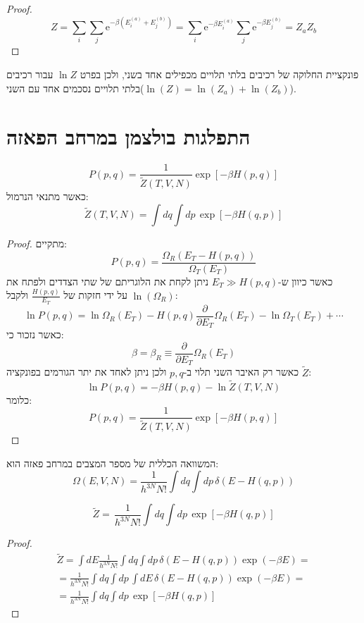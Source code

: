 \documentclass{tstextbook}
\begin{document}
\begin{proof}
$$Z=\sum_{i}\sum_{j}\mathrm{e}^{-\beta(E_{i}^{(a)}+E_{j}^{(b)})}=\sum_{i}\mathrm{e}^{-\beta E_{i}^{(a)}}\sum_{j}\mathrm{e}^{-\beta E_{j}^{(b)}}=Z_{a}Z_{b}$$

\end{proof}
\begin{corollary}
פונקציית החלוקה של רכיבים בלתי תלויים מכפילים אחד בשני, ולכן בפרט \(\ln Z\) עבור רכיבים בלתי תלויים נסכמים אחד עם השני(\(\ln(Z)=\ln(Z_{a})+\ln(Z_{b})\)).

\end{corollary}
\section{התפלגות בולצמן במרחב הפאזה}

\begin{proposition}
$$P(p,q)=\frac{1}{\tilde{Z}(T,V,N)}\exp[-\beta H(p,q)]$$
כאשר מתנאי הנרמול:
$$\tilde{Z}(T,V,N)=\int\!\!d q\int\!\!d p\,\exp[-\beta H(q,p)]$$

\end{proposition}
\begin{proof}
מתקיים:
$$P(p,q)=\frac{\Omega_{R}(E_{T}-H(p,q))}{\Omega_{T}(E_{T})}$$
כאשר כיוון ש-\(E_{T}\gg H(p,q)\) ניתן לקחת את הלוגריתם של שתי הצדדים ולפתח את \(\ln\left( \Omega_{R} \right)\) על ידי חזקות של \(\frac{H(p,q)}{E_{T}}\) ולקבל:
$$\ln P(p,q)=\ln\Omega_{R}(E_{T})-H(p,q)\frac{\partial}{\partial E_{T}}\Omega_{R}(E_{T})-\ln\Omega_{T}(E_{T})+\cdots$$
כאשר נזכור כי:
$$\beta=\beta_{R}\equiv\frac{\partial}{\partial E_{T}}\Omega_{R}(E_{T})$$
כאשר רק האיבר השני תלוי ב-\(p,q\) ולכן ניתן לאחד את יתר הגורמים בפונקציה \(\tilde{Z}\):
$$\ln P(p,q)=-\beta H(p,q)-\ln\tilde{Z}(T,V,N)$$
כלומר:
$$P(p,q)=\frac{1}{\tilde{Z}(T,V,N)}\exp[-\beta H(p,q)]$$

\end{proof}
\begin{reminder}
המשוואה הכללית של מספר המצבים במרחב פאזה הוא:
$$\Omega(E,V,N)=\frac{1}{h^{3N}N!}\int\!\!d q\int\!\!d p\,\delta(E-H(q,p))$$

\end{reminder}
\begin{corollary}
$$\widetilde{Z}=\,\frac{1}{h^{3N}N!}\int\!\!d q\int\!\!d p\,\exp[-\beta H(q,p)]$$

\end{corollary}
\begin{proof}
\begin{gather*}\widetilde{Z}=\int\!\!d E\frac{1}{h^{3N}N!}\int\!\!d q\int\!\!d p\,\delta(E-H(q,p))\exp\left( -\beta E \right)=\\=\frac{1}{h^{3N}N!}\int\!\!d q\int\!\!d p\,\int\!\!d E\,\delta(E-H(q,p))\exp\left( -\beta E \right)=\\=\frac{1}{h^{3N}N!}\int\!\!d q\int\!\!d p\,\exp\left[ -\beta H(q,p) \right] 
\end{gather*}

\end{proof}
\end{document}
